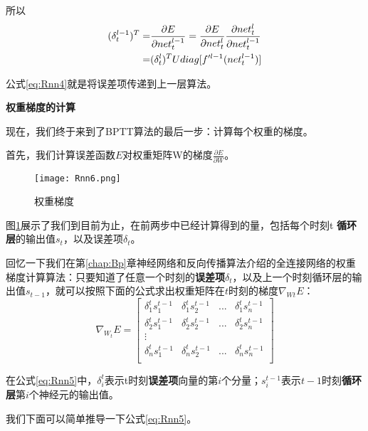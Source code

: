 所以
\begin{align}
	(\delta_t^{l-1})^T= & \frac{\partial{E}}{\partial{{net}_t^{l-1}}}=\frac{\partial{E}}{\partial{{net}_t^l}}\frac{\partial{{net}_t^l}}{\partial{{net}_t^{l-1}}}\notag \\
	=                   & (\delta_t^l)^TUdiag[f'^{l-1}({net}_t^{l-1})]\label{eq:Rnn4}
\end{align}


公式\ref{eq:Rnn4}就是将误差项传递到上一层算法。

\textbf{权重梯度的计算}

现在，我们终于来到了BPTT算法的最后一步：计算每个权重的梯度。

首先，我们计算误差函数$E$对权重矩阵W的梯度\(\frac{\partial{E}}{\partial{W}}\)。

\begin{figure}[!h]
	\centering
	\texttt{[image: Rnn6.png]}
	\caption{权重梯度}
	\label{fig:Rnn6}
\end{figure}

图\ref{fig:Rnn6}展示了我们到目前为止，在前两步中已经计算得到的量，包括每个时刻t
\textbf{循环层}的输出值\(s_t\)，以及误差项\(\delta_t\)。

回忆一下我们在第\ref{chap:Bp}章神经网络和反向传播算法介绍的全连接网络的权重梯度计算算法：只要知道了任意一个时刻的\textbf{误差项}\(\delta_t\)，以及上一个时刻循环层的输出值\({s}_{t-1}\)，就可以按照下面的公式求出权重矩阵在$t$时刻的梯度\(\nabla_{Wt}E\)：
\begin{equation}
	\label{eq:Rnn5}
	\nabla_{W_t}E=\begin{bmatrix}
		\delta_1^ts_1^{t-1} & \delta_1^ts_2^{t-1} & ... & \delta_1^ts_n^{t-1} \\
		\delta_2^ts_1^{t-1} & \delta_2^ts_2^{t-1} & ... & \delta_2^ts_n^{t-1} \\
		\vdots                                                                \\
		\delta_n^ts_1^{t-1} & \delta_n^ts_2^{t-1} & ... & \delta_n^ts_n^{t-1} \\
	\end{bmatrix}
\end{equation}

在公式\ref{eq:Rnn5}中，\(\delta_i^t\)表示t时刻\textbf{误差项}向量的第$i$个分量；\(s_i^{t-1}\)表示$t-1$时刻\textbf{循环层}第$i$个神经元的输出值。

我们下面可以简单推导一下公式\ref{eq:Rnn5}。

